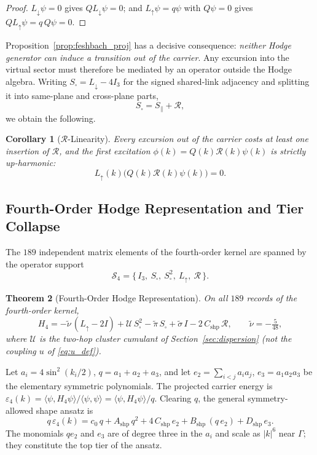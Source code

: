 \documentclass[11pt,a4paper]{article}
\newtheorem{theorem}{Theorem}[section]
\newtheorem{corollary}[theorem]{Corollary}
\theoremstyle{definition}
\newcommand{\Ldn}{L_{\downarrow}}
\newcommand{\Lup}{L_{\uparrow}}
\newcommand{\Ssq}{S_{\square}}
\newcommand{\Rc}{\mathcal{R}}          %
\newcommand{\Utwo}{\mathcal{U}}        %
\newcommand{\Ashp}{A_{\mathrm{shp}}}
\newcommand{\Bshp}{B_{\mathrm{shp}}}
\newcommand{\Cshp}{C_{\mathrm{shp}}}
\newcommand{\Dshp}{D_{\mathrm{shp}}}
\begin{document}
\begin{proof}
$\Ldn\psi = 0$ gives $Q\Ldn\psi = 0$; and $\Lup\psi = q\psi$ with $Q\psi = 0$ gives $Q\Lup\psi = q\,Q\psi = 0$.
\end{proof}

Proposition~\ref{prop:feshbach_proj} has a decisive consequence: \emph{neither Hodge generator can induce a transition out of the carrier}. Any excursion into the virtual sector must therefore be mediated by an operator outside the Hodge algebra. Writing $\Ssq = \Ldn - 4I_3$ for the signed shared-link adjacency and splitting it into same-plane and cross-plane parts,
\begin{equation}
  \Ssq = S_\parallel + \Rc,
\end{equation}
we obtain the following.

\begin{corollary}[$\Rc$-Linearity]\label{cor:R_linearity}
Every excursion out of the carrier costs at least one insertion of $\Rc$, and the first excitation $\phi(k) = Q(k)\Rc(k)\psi(k)$ is strictly up-harmonic:
\begin{equation}
  \Lup(k)\bigl(Q(k)\Rc(k)\psi(k)\bigr) = 0 .
\end{equation}
\end{corollary}

\subsection{Fourth-Order Hodge Representation and Tier Collapse}

The $189$ independent matrix elements of the fourth-order kernel are spanned by the operator support
\begin{equation}\label{eq:support_set}
  \mathcal{S}_4 = \{\,I_3,\ \Ssq,\ \Ssq^2,\ \Lup,\ \Rc\,\}.
\end{equation}

\begin{theorem}[Fourth-Order Hodge Representation]\label{thm:hodge_decomp}
On all $189$ records of the fourth-order kernel,
\begin{equation}\label{eq:H4_hodge}
  H_4 = -\tilde\nu\,(\Lup - 2I) + \Utwo\,\Ssq^2 - \tilde\pi\,\Ssq + \tilde\sigma\,I - 2\,\Cshp\,\Rc,
  \qquad \tilde\nu = -\tfrac{5}{48},
\end{equation}
where $\Utwo$ is the two-hop cluster cumulant of Section~\ref{sec:dispersion} (not the coupling $u$ of \eqref{eq:u_def}).
\end{theorem}

Let $a_i = 4\sin^2(k_i/2)$, $q = a_1+a_2+a_3$, and let $e_2 = \sum_{i<j}a_ia_j$, $e_3 = a_1a_2a_3$ be the elementary symmetric polynomials. The projected carrier energy is $\varepsilon_4(k) = \langle\psi,H_4\psi\rangle/\langle\psi,\psi\rangle = \langle\psi,H_4\psi\rangle/q$. Clearing $q$, the general symmetry-allowed shape ansatz is
\begin{equation}\label{eq:shape_ansatz}
  q\,\varepsilon_4(k) = c_0\,q + \Ashp\,q^2 + 4\,\Cshp\,e_2 + \Bshp\,(q\,e_2) + \Dshp\,e_3 .
\end{equation}
The monomials $q e_2$ and $e_3$ are of degree three in the $a_i$ and scale as $|k|^6$ near $\Gamma$; they constitute the top tier of the ansatz.
\end{document}

